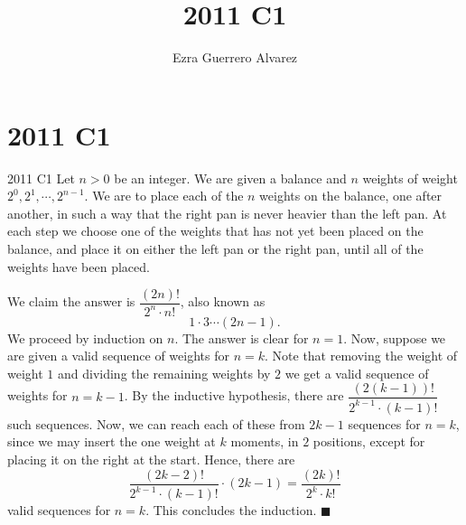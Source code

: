 \documentclass[14pt]{article}
\title{2011 C1}
\author{Ezra Guerrero Alvarez}
\begin{document}
\maketitle
	
\section*{2011 C1}

\begin{statement}{2011 C1}
	Let $n > 0$ be an integer. We are given a balance and $n$ weights of weight $2^0, 2^1, \cdots, 2^{n-1}$. We are to place each of the $n$ weights on the balance, one after another, in such a way that the right pan is never heavier than the left pan. At each step we choose one of the weights that has not yet been placed on the balance, and place it on either the left pan or the right pan, until all of the weights have been placed.
\end{statement}
We claim the answer is $\dfrac{(2n)!}{2^n\cdot n!}$, also known as
\[ 1\cdot3\cdots(2n-1). \]
We proceed by induction on $n$. The answer is clear for $n=1$. Now, suppose we are given a valid sequence of weights for $n=k$. Note that removing the weight of weight $1$ and dividing the remaining weights by $2$ we get a valid sequence of weights for $n=k-1$. By the inductive hypothesis, there are $\dfrac{(2(k-1))!}{2^{k-1}\cdot (k-1)!}$ such sequences. Now, we can reach each of these from $2k-1$ sequences for $n=k$, since we may insert the one weight at $k$ moments, in $2$ positions, except for placing it on the right at the start. Hence, there are
\[ \dfrac{(2k-2)!}{2^{k-1}\cdot (k-1)!}\cdot(2k-1)=\dfrac{(2k)!}{2^k\cdot k!} \]
valid sequences for $n=k$. This concludes the induction. $\blacksquare$
	
\end{document}
